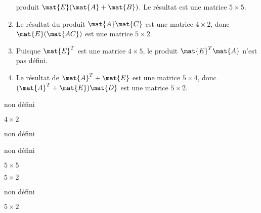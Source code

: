 \begin{exercice}
\begin{sol}
\begin{enumerate}
      produit $\mat{E}(\mat{A} + \mat{B})$. Le résultat est une
      matrice $5 \times 5$.
    \item Le résultat du produit $\mat{A} \mat{C}$ est une matrice $4
      \times 2$, donc $\mat{E}(\mat{AC})$ est une matrice $5 \times 2$.
    \item Puisque $\mat{E}^T$ est une matrice $4 \times 5$, le produit
      $\mat{E}^T \mat{A}$ n'est pas défini.
    \item Le résultat de $\mat{A}^T + \mat{E}$ est une matrice $5
      \times 4$, donc $(\mat{A}^T + \mat{E}) \mat{D}$ est une matrice
      $5 \times 2$.
    \end{enumerate}
  \end{sol}
  \begin{rep}
    \begin{inparaenum}
    \item non défini
    \item $4 \times 2$
    \item non défini
    \item non défini
    \item $5 \times 5$
    \item $5 \times 2$
    \item non défini
    \item $5 \times 2$
    \end{inparaenum}
  \end{rep}
\end{exercice}

